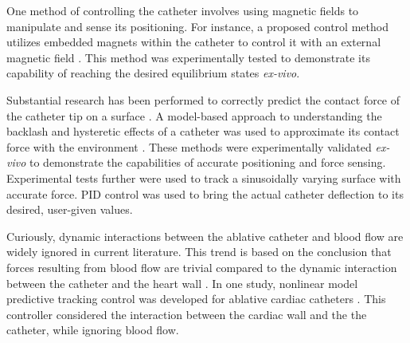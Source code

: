 \documentclass[letterpaper,10pt,conference]{ieeeconf}   %
\begin{document}
One method of controlling the catheter involves using magnetic fields to manipulate and sense its positioning. For instance, a proposed control method utilizes embedded magnets within the catheter to control it with an external magnetic field \cite{le:16a}. This method was experimentally tested to demonstrate its capability of reaching the desired equilibrium states \textit{ex-vivo}. 

Substantial research has been performed to correctly predict the contact force of the catheter tip on a surface \cite{natale:14a}. A model-based approach to understanding the backlash and hysteretic effects of a catheter was used to approximate its contact force with the environment \cite{khoshnam:14a}. These methods were experimentally validated \textit{ex-vivo} to demonstrate the capabilities of accurate positioning and force sensing. Experimental tests further were used to track a sinusoidally varying surface with accurate force. PID control was used to bring the actual catheter deflection to its desired, user-given values.

Curiously, dynamic interactions between the ablative catheter and blood flow are widely ignored in current literature. This trend is based on the conclusion that forces resulting from blood flow are trivial compared to the dynamic interaction between the catheter and the heart wall \cite{salimi:11a}. In one study, nonlinear model predictive tracking control was developed for ablative cardiac catheters \cite{soltani:17a}. This controller considered the interaction between the cardiac wall and the the catheter, while ignoring blood flow.

\end{document}
